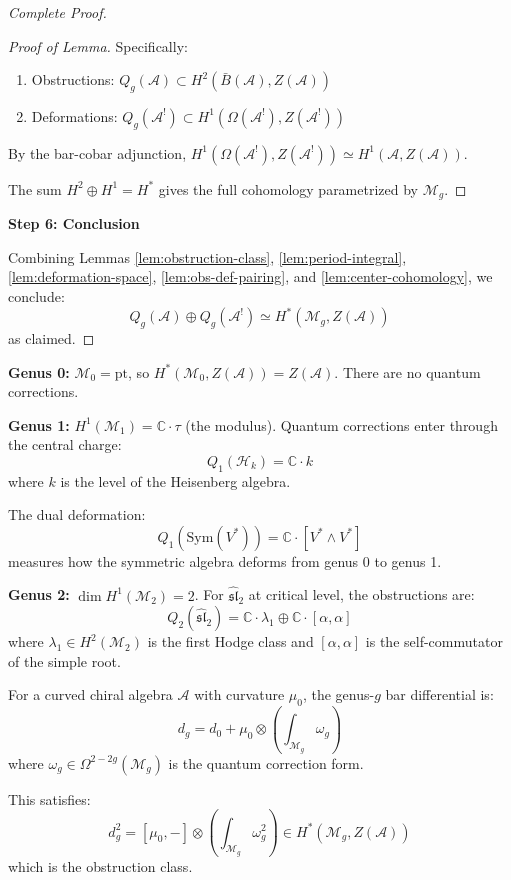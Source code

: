 \begin{proof}[Complete Proof]
\begin{proof}[Proof of Lemma]
Specifically:
\begin{enumerate}
\item Obstructions: $Q_g(\mathcal{A}) \subset H^2(\bar{B}(\mathcal{A}), Z(\mathcal{A}))$
\item Deformations: $Q_g(\mathcal{A}^!) \subset H^1(\Omega(\mathcal{A}^!), Z(\mathcal{A}^!))$
\end{enumerate}

By the bar-cobar adjunction, $H^1(\Omega(\mathcal{A}^!), Z(\mathcal{A}^!)) \simeq 
H^1(\mathcal{A}, Z(\mathcal{A}))$.

The sum $H^2 \oplus H^1 = H^*$ gives the full cohomology parametrized by $\mathcal{M}_g$.
\end{proof}

\textbf{Step 6: Conclusion}

Combining Lemmas \ref{lem:obstruction-class}, \ref{lem:period-integral}, 
\ref{lem:deformation-space}, \ref{lem:obs-def-pairing}, and \ref{lem:center-cohomology}, 
we conclude:
$$Q_g(\mathcal{A}) \oplus Q_g(\mathcal{A}^!) \simeq H^*(\mathcal{M}_g, Z(\mathcal{A}))$$
as claimed.

\end{proof}

\begin{remark}\label{rem:explicit-low-genus-curved}

\textbf{Genus 0:} $\mathcal{M}_0 = \text{pt}$, so $H^*(\mathcal{M}_0, Z(\mathcal{A})) 
= Z(\mathcal{A})$. There are no quantum corrections.

\textbf{Genus 1:} $H^1(\mathcal{M}_1) = \mathbb{C} \cdot \tau$ (the modulus). 
Quantum corrections enter through the central charge:
$$Q_1(\mathcal{H}_k) = \mathbb{C} \cdot k$$
where $k$ is the level of the Heisenberg algebra.

The dual deformation:
$$Q_1(\text{Sym}(V^*)) = \mathbb{C} \cdot [V^* \wedge V^*]$$
measures how the symmetric algebra deforms from genus 0 to genus 1.

\textbf{Genus 2:} $\dim H^1(\mathcal{M}_2) = 2$. For $\widehat{\mathfrak{sl}}_2$ at 
critical level, the obstructions are:
$$Q_2(\widehat{\mathfrak{sl}}_2) = \mathbb{C} \cdot \lambda_1 \oplus \mathbb{C} \cdot 
[\alpha, \alpha]$$
where $\lambda_1 \in H^2(\mathcal{M}_2)$ is the first Hodge class and $[\alpha, \alpha]$ 
is the self-commutator of the simple root.
\end{remark}

\begin{corollary}\label{cor:curved-differential}
For a curved chiral algebra $\mathcal{A}$ with curvature $\mu_0$, the genus-$g$ bar 
differential is:
$$d_g = d_0 + \mu_0 \otimes \left(\int_{\mathcal{M}_g} \omega_g\right)$$
where $\omega_g \in \Omega^{2-2g}(\mathcal{M}_g)$ is the quantum correction form.

This satisfies:
$$d_g^2 = [\mu_0, -] \otimes \left(\int_{\mathcal{M}_g} \omega_g^2\right) 
\in H^*(\mathcal{M}_g, Z(\mathcal{A}))$$
which is the obstruction class.
\end{corollary}

